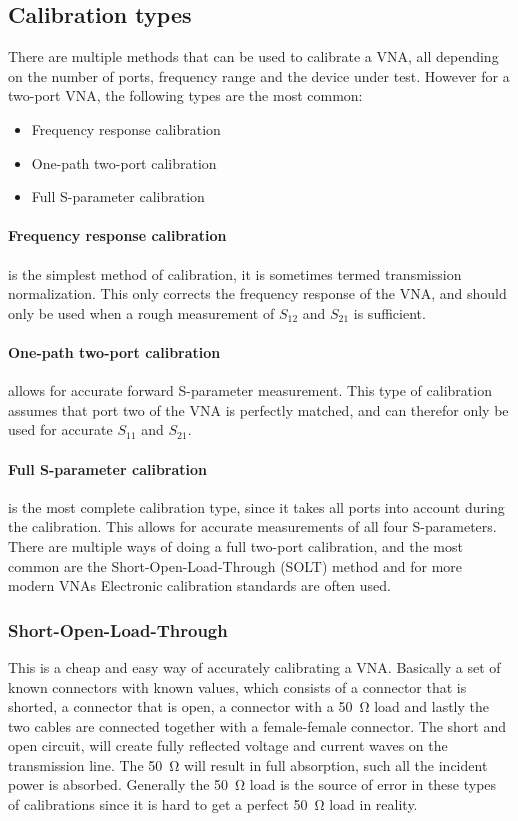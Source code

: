 \subsection{Calibration types}
There are multiple methods that can be used to calibrate a VNA, all depending on the number of ports, frequency range and the device under test. However for a two-port VNA, the following types are the most common:

\begin{itemize}
\item Frequency response calibration
\item One-path two-port calibration
\item Full S-parameter calibration
\end{itemize}

\paragraph{Frequency response calibration} is the simplest method of calibration, it is sometimes termed transmission normalization. This only corrects the frequency response of the VNA, and should only be used when a rough measurement of $S_{12}$ and  $S_{21}$ is sufficient. 
\paragraph{One-path two-port calibration} allows for accurate forward S-parameter measurement. This type of calibration assumes that port two of the VNA is perfectly matched, and can therefor only be used for accurate $S_{11}$ and $S_{21}$.
\paragraph{Full S-parameter calibration} is the most complete calibration type, since it takes all ports into account during the calibration. This allows for accurate measurements of all four S-parameters. There are multiple ways of doing a full two-port calibration, and the most common are the Short-Open-Load-Through (SOLT) method and for more modern VNAs Electronic calibration standards are often used. 

\subsubsection{Short-Open-Load-Through}
This is a cheap and easy way of accurately calibrating a VNA. Basically a set of known connectors with known values, which consists of a connector that is shorted, a connector that is open, a connector with a \SI{50}{\ohm} load and lastly the two cables are connected together with a female-female connector. The short and open circuit, will create fully reflected voltage and current waves on the transmission line. The \SI{50}{\ohm} will result in full absorption, such all the incident power is absorbed\cite{agilentAppNoteVNA}. Generally the \SI{50}{\ohm} load is the source of error in these types of calibrations since it is hard to get a perfect \SI{50}{\ohm} load in reality\cite{nationalInstruVNA}. 

